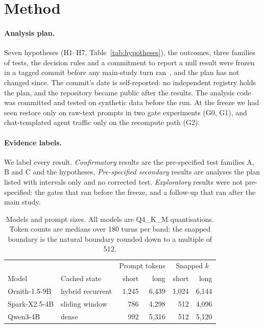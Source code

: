 \section{Method}
\label{sec:method}

\paragraph{Analysis plan.}
Seven hypotheses (H1--H7, Table~\ref{tab:hypotheses}), the outcomes, three
families of tests, the decision rules and a commitment to report a null result
were frozen in a tagged commit before any main-study turn ran~\preregcite{},
and the plan has not changed since. The commit's date is self-reported: no
independent registry holds the plan, and the repository became public after
the results. The
analysis code was committed and tested on synthetic data before the run. At the
freeze we had seen restore only on raw-text prompts in two gate experiments
(G0, G1), and chat-templated agent traffic only on the recompute path (G2).

\paragraph{Evidence labels.}
\label{sec:labels}
We label every result. \emph{Confirmatory} results are the pre-specified test
families A, B and C and the hypotheses. \emph{Pre-specified secondary} results
are analyses the plan listed with intervals only and no corrected test.
\emph{Exploratory} results were not pre-specified: the gates that ran before
the freeze, and a follow-up that ran after the main study.

\begin{table}[t]
\caption{Models and prompt sizes. All models are Q4\_K\_M quantisations. Token
counts are medians over 180 turns per band; the snapped boundary is the natural
boundary rounded down to a multiple of 512.}
\label{tab:setup}
\small
\setlength{\tabcolsep}{4.5pt}
\begin{tabular}{@{}llrrrr@{}}
\toprule
 & & \multicolumn{2}{c}{Prompt tokens} & \multicolumn{2}{c}{Snapped $k$} \\
Model & Cached state & short & long & short & long \\
\midrule
Ornith-1.5-9B & hybrid recurrent & 1{,}245 & 6{,}439 & 1{,}024 & 6{,}144 \\
Spark-X2.5-4B & sliding window & 786 & 4{,}298 & 512 & 4{,}096 \\
Qwen3-4B & dense & 992 & 5{,}316 & 512 & 5{,}120 \\
\bottomrule
\end{tabular}
\end{table}

